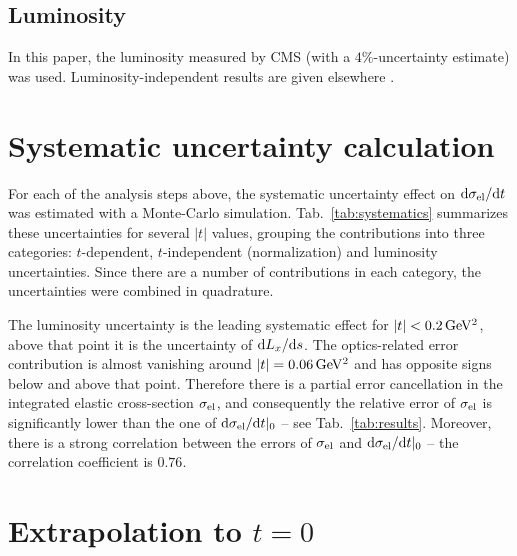 \documentclass[doublecol]{epl/epl2}
\def\d{{\rm d}}
\def\un#1{\,{\rm #1}}
\begin{document}
\subsection{Luminosity}

In this paper, the luminosity measured by CMS (with a $4\%$-uncertainty estimate) was used.
Luminosity-independent results are given elsewhere \cite{P3}.



\section{Systematic uncertainty calculation}


For each of the analysis steps above, the systematic uncertainty effect on $\d\sigma_{\rm el}/\d t$ was estimated with a Monte-Carlo simulation. Tab.~\ref{tab:systematics} summarizes these uncertainties for several $|t|$ values, grouping the contributions into three categories: $t$-dependent, $t$-independent (normalization) and luminosity uncertainties. Since there are a number of contributions in each category, the uncertainties were combined in quadrature.

The luminosity uncertainty is the leading systematic effect for $|t| < 0.2\un{GeV^2}$, above that point it is the uncertainty of $\d L_x/\d s$. The optics-related error contribution is almost vanishing around $|t| = 0.06\un{GeV^2}$ and has opposite signs below and above that point. Therefore there is a partial error cancellation in the integrated elastic cross-section $\sigma_{\rm el}$, and consequently the relative error of $\sigma_{\rm el}$ is significantly lower than the one of $\d\sigma_{\rm el}/\d t|_0$ -- see Tab.~\ref{tab:results}. Moreover, there is a strong correlation between the errors of $\sigma_{\rm el}$ and $\d\sigma_{\rm el}/\d t|_0$ -- the correlation coefficient is $0.76$.



\section{Extrapolation to $t=0$}
\end{document}
